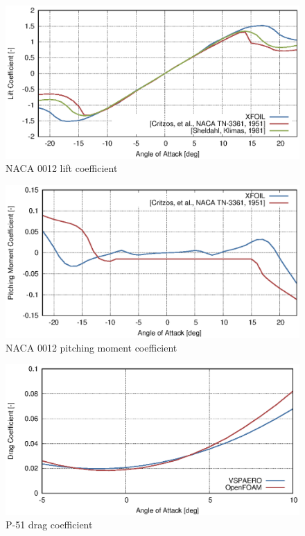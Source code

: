 \begin{figure}
  \centering
  \includegraphics[width=140mm]{images/xfoil_naca0012_cz.eps}
  \caption{NACA 0012 lift coefficient}
  \label{fig-cfd-result-xfoil-cz}
\end{figure}

\begin{figure}
  \centering
  \includegraphics[width=140mm]{images/xfoil_naca0012_cm.eps}
  \caption{NACA 0012 pitching moment coefficient}
  \label{fig-cfd-result-xfoil-cm}
\end{figure}

\begin{figure}
  \centering
  \includegraphics[width=140mm]{images/vspaero_p51_cx.eps}
  \caption{P-51 drag coefficient}
  \label{fig-cfd-result-vspaero-cx}
\end{figure}

